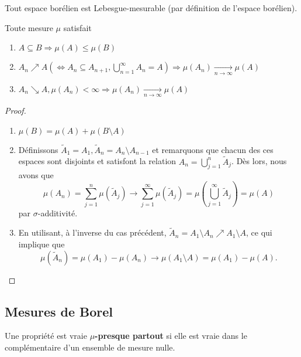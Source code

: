 \begin{theo}
    Tout espace borélien est Lebesgue-mesurable (par définition de l'espace borélien).
\end{theo}

\begin{theo}
    Toute mesure $\mu$ satisfait
    \begin{enumerate}[label=(\roman*)]
        \item $A\subseteq B \Rightarrow \mu(A)\leq\mu(B)$
        \item $A_n\nearrow A (\Leftrightarrow A_n \subseteq A_{n+1}, \bigcup_{n=1}^\infty A_n = A) \Rightarrow  \mu(A_n) \underset{n\to\infty}{\to} \mu(A)$
        \item $A_n \searrow A, \mu(A_n)<\infty \Rightarrow \mu(A_n) \underset{n\to\infty}{\to} \mu(A)$
    \end{enumerate}
\end{theo}
\begin{proof}
    \begin{enumerate}[label=(\roman*)]
        \item $\mu(B) = \mu(A) + \mu(B\setminus A)$
        \item Définissons $\tilde{A}_1 = A_1, \tilde{A}_n = A_n\setminus A_{n-1}$ et remarquons que chacun des ces espaces sont disjoints et satisfont la relation $A_n = \bigcup_{j=1}^n \tilde{A}_j$. Dès lors, nous avons que
        \begin{equation*}
            \mu(A_n) = \sum_{j=1}^n \mu(\tilde{A}_j) \to \sum_{j=1}^\infty \mu(\tilde{A}_j) = \mu(\bigcup_{j=1}^\infty \tilde{A}_j) = \mu(A)
        \end{equation*}
        par $\sigma$-additivité.
        \item En utilisant, à l'inverse du cas précédent, $\tilde{A}_n = A_1\setminus A_n \nearrow A_1\setminus A$, ce qui implique que
        \begin{equation*}
            \mu(\tilde{A}_n) = \mu(A_1) - \mu(A_n) \to \mu(A_1\setminus A) = \mu(A_1) - \mu(A).
        \end{equation*}
    \end{enumerate}
\end{proof}

\subsection{Mesures de Borel}

\begin{definition}
    Une propriété est vraie \textbf{$\mu$-presque partout} si elle est vraie dans le complémentaire d'un ensemble de mesure nulle.
\end{definition}

